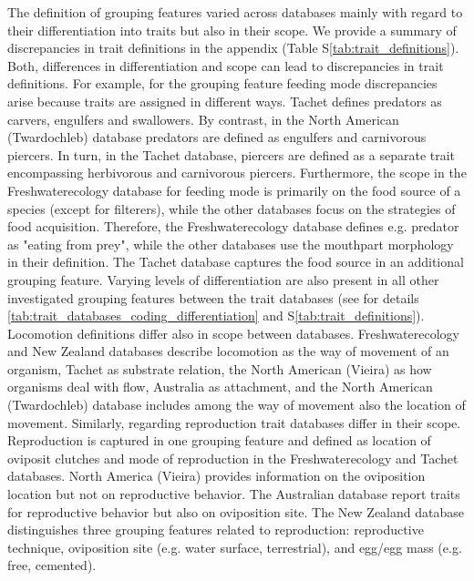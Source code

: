 \documentclass[../Draft_harmonization_paper.tex]{subfiles}
\begin{document}
The definition of grouping features varied across databases mainly with regard to their differentiation into traits but also in their scope. We provide a summary of discrepancies in trait definitions in the appendix (Table S\ref{tab:trait_definitions}). Both, differences in differentiation and scope can lead to discrepancies in trait definitions. For example, for the grouping feature feeding mode discrepancies arise because traits are assigned in different ways. Tachet defines predators as carvers, engulfers and swallowers. By contrast, in the North American (Twardochleb) database predators are defined as engulfers and carnivorous piercers. In turn, in the Tachet database, piercers are defined as a separate trait encompassing herbivorous and carnivorous piercers. Furthermore, the scope in the Freshwaterecology database for feeding mode is primarily on the food source of a species (except for filterers), while the other databases focus on the strategies of food acquisition. Therefore, the Freshwaterecology database defines e.g. predator as "eating from prey", while the other databases use the mouthpart morphology in their definition. The Tachet database captures the food source in an additional grouping feature. Varying levels of differentiation are also present in all other investigated grouping features between the trait databases (see for details \ref{tab:trait_databases_coding_differentiation} and S\ref{tab:trait_definitions}). Locomotion definitions differ also in scope between databases. Freshwaterecology and New Zealand databases describe locomotion as the way of movement of an organism, Tachet as substrate relation, the North American (Vieira) as how organisms deal with flow, Australia as attachment, and the North American (Twardochleb) database includes among the way of movement also the location of movement. Similarly, regarding reproduction trait databases differ in their scope. Reproduction is captured in one grouping feature and defined as location of oviposit clutches and mode of reproduction in the Freshwaterecology and Tachet databases. North America (Vieira) provides information on the oviposition location but not on reproductive behavior. The Australian database report traits for reproductive behavior but also on oviposition site. The New Zealand database distinguishes three grouping features related to reproduction: reproductive technique, oviposition site (e.g. water surface, terrestrial), and egg/egg mass (e.g. free, cemented).
\end{document}
